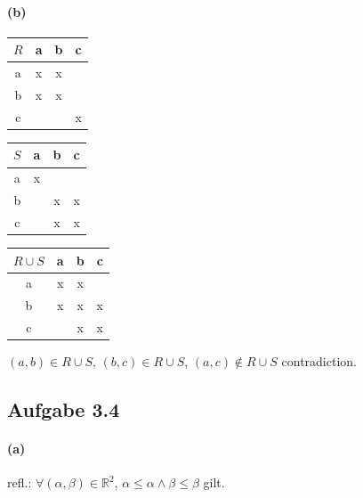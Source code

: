 \paragraph{(b)}
\begin{center}
\begin{tabular}{|c|c|c|c|}
\hline
$R$ & a & b & c \\
\hline
a & x & x &   \\
b & x & x &   \\
c &   &   & x \\
\hline
\end{tabular}
\end{center}

\begin{center}
\begin{tabular}{|c|c|c|c|}
\hline
$S$ & a & b & c \\
\hline
a & x &   &   \\
b &   & x & x \\
c &   & x & x \\
\hline
\end{tabular}
\end{center}

\begin{center}
\begin{tabular}{|c|c|c|c|}
\hline
$R\cup S$ & a & b & c \\
\hline
a & x & x &   \\
b & x & x & x \\
c &   & x & x \\
\hline
\end{tabular}
\end{center}

$(a,b)\in R\cup S$, $(b,c)\in R\cup S$, $(a,c)\notin R\cup S$ contradiction.\\

\newpage

\subsection{Aufgabe 3.4}

\paragraph{(a)}

refl.: $\forall (\alpha, \beta)\in\mathbb{R}^2$, $\alpha\leq\alpha\wedge\beta\leq\beta$ gilt.\\

